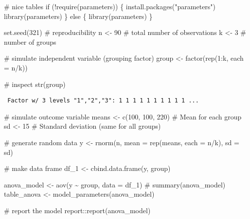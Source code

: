 \documentclass[
  singlecolumn]{article}
\newenvironment{Shaded}{}{}
\newcommand{\AttributeTok}[1]{\textcolor[rgb]{0.84,0.23,0.29}{#1}}
\newcommand{\CommentTok}[1]{\textcolor[rgb]{0.42,0.45,0.49}{#1}}
\newcommand{\ControlFlowTok}[1]{\textcolor[rgb]{0.84,0.23,0.29}{#1}}
\newcommand{\DecValTok}[1]{\textcolor[rgb]{0.00,0.36,0.77}{#1}}
\newcommand{\FunctionTok}[1]{\textcolor[rgb]{0.44,0.26,0.76}{#1}}
\newcommand{\NormalTok}[1]{\textcolor[rgb]{0.14,0.16,0.18}{#1}}
\newcommand{\OtherTok}[1]{\textcolor[rgb]{0.44,0.26,0.76}{#1}}
\newcommand{\SpecialCharTok}[1]{\textcolor[rgb]{0.00,0.36,0.77}{#1}}
\newcommand{\StringTok}[1]{\textcolor[rgb]{0.01,0.18,0.38}{#1}}
\theoremstyle{definition}
\theoremstyle{remark}
\begin{document}
\begin{Shaded}
\begin{Highlighting}[]
\CommentTok{\# nice tables}
\ControlFlowTok{if}\NormalTok{ (}\SpecialCharTok{!}\FunctionTok{require}\NormalTok{(parameters)) \{}
  \FunctionTok{install.packages}\NormalTok{(}\StringTok{"parameters"}\NormalTok{)}
  \FunctionTok{library}\NormalTok{(parameters)}
\NormalTok{\} }\ControlFlowTok{else}\NormalTok{ \{}
  \FunctionTok{library}\NormalTok{(parameters)}
\NormalTok{\}}


\FunctionTok{set.seed}\NormalTok{(}\DecValTok{321}\NormalTok{) }\CommentTok{\# reproducibility}
\NormalTok{n }\OtherTok{\textless{}{-}} \DecValTok{90} \CommentTok{\# total number of observations}
\NormalTok{k }\OtherTok{\textless{}{-}} \DecValTok{3} \CommentTok{\# number of groups}

\CommentTok{\# simulate independent variable (grouping factor)}
\NormalTok{group }\OtherTok{\textless{}{-}} \FunctionTok{factor}\NormalTok{(}\FunctionTok{rep}\NormalTok{(}\DecValTok{1}\SpecialCharTok{:}\NormalTok{k, }\AttributeTok{each =}\NormalTok{ n}\SpecialCharTok{/}\NormalTok{k))}

\CommentTok{\# inspect}
\FunctionTok{str}\NormalTok{(group)}
\end{Highlighting}
\end{Shaded}

\begin{verbatim}
 Factor w/ 3 levels "1","2","3": 1 1 1 1 1 1 1 1 1 1 ...
\end{verbatim}

\begin{Shaded}
\begin{Highlighting}[]
\CommentTok{\# simulate outcome variable}
\NormalTok{means }\OtherTok{\textless{}{-}} \FunctionTok{c}\NormalTok{(}\DecValTok{100}\NormalTok{, }\DecValTok{100}\NormalTok{, }\DecValTok{220}\NormalTok{) }\CommentTok{\# Mean for each group}
\NormalTok{sd }\OtherTok{\textless{}{-}} \DecValTok{15} \CommentTok{\# Standard deviation (same for all groups)}

\CommentTok{\# generate random data}
\NormalTok{y }\OtherTok{\textless{}{-}} \FunctionTok{rnorm}\NormalTok{(n, }\AttributeTok{mean =} \FunctionTok{rep}\NormalTok{(means, }\AttributeTok{each =}\NormalTok{ n}\SpecialCharTok{/}\NormalTok{k), }\AttributeTok{sd =}\NormalTok{ sd)}


\CommentTok{\# make data frame}
\NormalTok{df\_1 }\OtherTok{\textless{}{-}} \FunctionTok{cbind.data.frame}\NormalTok{(y, group)}

\NormalTok{anova\_model }\OtherTok{\textless{}{-}} \FunctionTok{aov}\NormalTok{(y }\SpecialCharTok{\textasciitilde{}}\NormalTok{ group, }\AttributeTok{data =}\NormalTok{ df\_1)}
\CommentTok{\# summary(anova\_model)}
\NormalTok{table\_anova }\OtherTok{\textless{}{-}} \FunctionTok{model\_parameters}\NormalTok{(anova\_model)}

\CommentTok{\# report the model}
\NormalTok{report}\SpecialCharTok{::}\FunctionTok{report}\NormalTok{(anova\_model)}
\end{Highlighting}
\end{Shaded}
\end{document}
